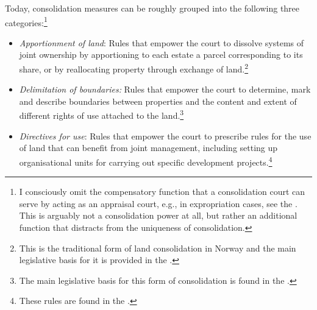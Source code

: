 
Today, consolidation measures can be roughly grouped into the following three categories:\footnote{I consciously omit the compensatory function that a consolidation court can serve by acting as an appraisal court, e.g., in expropriation cases, see the \dni\cite[1-4(d)]{lca13}. This is arguably not a consolidation power at all, but rather an additional function that distracts from the uniqueness of consolidation.}

\begin{itemize}
\item \emph{Apportionment of land}: Rules that empower the court to dissolve systems of joint ownership by apportioning to each estate a parcel corresponding to its share, or by reallocating property through exchange of land.\footnote{This is the traditional form of land consolidation in Norway and the main legislative basis for it is provided in the \dni\cite[2]{lca79}.}
\item \emph{Delimitation of boundaries:} Rules that empower the court to determine, mark and describe boundaries between properties and the content and extent of different rights of use attached to the land.\footnote{The main legislative basis for this form of consolidation is found in the \dni\cite[88]{lca79}.}
\item \emph{Directives for use}: Rules that empower the court to prescribe rules for the use of land that can benefit from joint management, including setting up organisational units for carrying out specific development projects.\footnote{These rules are found in the \dni\cite[2 c), 34, 35]{lca79}.}
\end{itemize}

